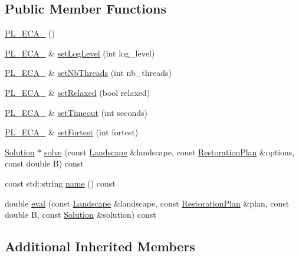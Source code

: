 \subsection*{Public Member Functions}
\begin{DoxyCompactItemize}
\item 
\hyperlink{class_solvers_1_1_p_l___e_c_a__2_adcc16b55e0d26128fe508bc3f282c29a}{P\+L\+\_\+\+E\+C\+A\+\_} ()
\item 
\hyperlink{class_solvers_1_1_p_l___e_c_a__2}{P\+L\+\_\+\+E\+C\+A\+\_} \& \hyperlink{class_solvers_1_1_p_l___e_c_a__2_a1d868cd61115206cdc692fff35fa584e}{set\+Log\+Level} (int log\+\_\+level)
\item 
\hyperlink{class_solvers_1_1_p_l___e_c_a__2}{P\+L\+\_\+\+E\+C\+A\+\_} \& \hyperlink{class_solvers_1_1_p_l___e_c_a__2_a893f9660cdc4cfd0eab2db5bb7e82407}{set\+Nb\+Threads} (int nb\+\_\+threads)
\item 
\hyperlink{class_solvers_1_1_p_l___e_c_a__2}{P\+L\+\_\+\+E\+C\+A\+\_} \& \hyperlink{class_solvers_1_1_p_l___e_c_a__2_a98ab5e83866c6beeb706ed86cd14afa1}{set\+Relaxed} (bool relaxed)
\item 
\hyperlink{class_solvers_1_1_p_l___e_c_a__2}{P\+L\+\_\+\+E\+C\+A\+\_} \& \hyperlink{class_solvers_1_1_p_l___e_c_a__2_a40ef2df054be492783836af74a3436b3}{set\+Timeout} (int seconds)
\item 
\hyperlink{class_solvers_1_1_p_l___e_c_a__2}{P\+L\+\_\+\+E\+C\+A\+\_} \& \hyperlink{class_solvers_1_1_p_l___e_c_a__2_ae57ac8fbae31047fb0a9d72f7427a661}{set\+Fortest} (int fortest)
\item 
\hyperlink{class_solution}{Solution} $\ast$ \hyperlink{class_solvers_1_1_p_l___e_c_a__2_a07601fa43e0c530e7a66b1532a9e96a6}{solve} (const \hyperlink{class_landscape}{Landscape} \&landscape, const \hyperlink{class_restoration_plan}{Restoration\+Plan} \&options, const double B) const
\item 
const std\+::string \hyperlink{class_solvers_1_1_p_l___e_c_a__2_ab9879a904a2545d929bd2956f23fa1aa}{name} () const
\item 
double \hyperlink{class_solvers_1_1_p_l___e_c_a__2_acc94c4cef3ea294af20215ae2ec77711}{eval} (const \hyperlink{class_landscape}{Landscape} \&landscape, const \hyperlink{class_restoration_plan}{Restoration\+Plan} \&plan, const double B, const \hyperlink{class_solution}{Solution} \&solution) const
\end{DoxyCompactItemize}
\subsection*{Additional Inherited Members}


